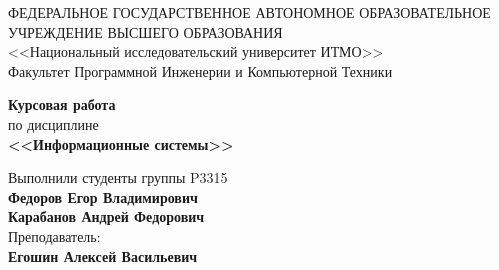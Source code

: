 \begin{titlepage}
	\thispagestyle{firststyle}
	\begin{center}
		ФЕДЕРАЛЬНОЕ ГОСУДАРСТВЕННОЕ АВТОНОМНОЕ ОБРАЗОВАТЕЛЬНОЕ УЧРЕЖДЕНИЕ ВЫСШЕГО ОБРАЗОВАНИЯ\\
		\vspace{0.5cm}
		<<Национальный исследовательский университет ИТМО>>\\
		Факультет Программной Инженерии и Компьютерной Техники \\
		\vspace{1cm}
	\end{center}

	\vspace{1cm}

	\begin{center}
		\large
		\textbf{Курсовая работа}\\
		по дисциплине\\
		\textbf{<<Информационные системы>>} \\
	\end{center}

	\vspace{2cm}

	\begin{flushright}
		Выполнили студенты  группы P3315\\
		\textbf{Федоров Егор Владимирович} \\
		\textbf{Карабанов Андрей Федорович} \\
		Преподаватель: \\
		\textbf{Егошин Алексей Васильевич}\\
	\end{flushright}
\end{titlepage}
